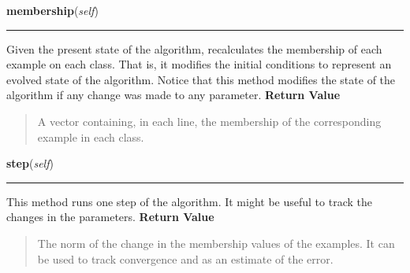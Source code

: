 \hspace{.8\funcindent}\begin{boxedminipage}{\funcwidth}

    \raggedright \textbf{membership}(\textit{self})

    \vspace{-1.5ex}

    \rule{\textwidth}{0.5\fboxrule}
\setlength{\parskip}{2ex}

Given the present state of the algorithm, recalculates the membership of
each example on each class. That is, it modifies the initial conditions
to represent an evolved state of the algorithm. Notice that this method
modifies the state of the algorithm if any change was made to any
parameter.
\setlength{\parskip}{1ex}
      \textbf{Return Value}
    \vspace{-1ex}

      \begin{quote}

A vector containing, in each line, the membership of the corresponding
example in each class.
      \end{quote}

    \end{boxedminipage}

    \label{peach:fuzzy:cmeans:FuzzyCMeans:step}

    \vspace{0.5ex}

\hspace{.8\funcindent}\begin{boxedminipage}{\funcwidth}

    \raggedright \textbf{step}(\textit{self})

    \vspace{-1.5ex}

    \rule{\textwidth}{0.5\fboxrule}
\setlength{\parskip}{2ex}

This method runs one step of the algorithm. It might be useful to track
the changes in the parameters.
\setlength{\parskip}{1ex}
      \textbf{Return Value}
    \vspace{-1ex}

      \begin{quote}

The norm of the change in the membership values of the examples. It
can be used to track convergence and as an estimate of the error.
      \end{quote}

    \end{boxedminipage}

